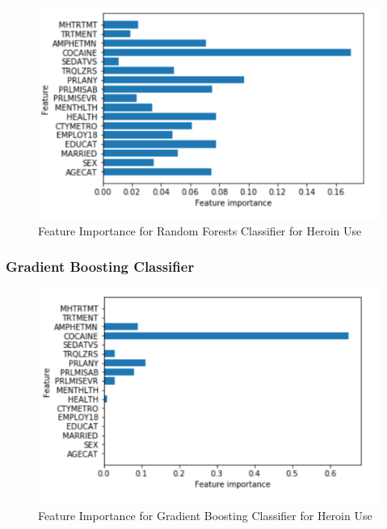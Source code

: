\documentclass[sigconf]{acmart}
\begin{document}
\begin{figure}[!ht]
  \centering\includegraphics[width=\columnwidth]{images/Figure7.pdf}
  \caption{Feature Importance for Random Forests Classifier for Heroin Use}
  \label{f:Figure7}
\end{figure}

\subsubsection{Gradient Boosting Classifier}


\begin{figure}[!ht]
  \centering\includegraphics[width=\columnwidth]{images/Figure8.pdf}
  \caption{Feature Importance for Gradient Boosting Classifier for Heroin Use}
  \label{f:Figure8}
\end{figure}



\end{document}
